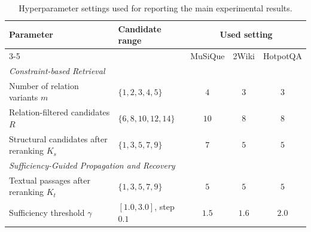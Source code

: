 \documentclass{article}
\theoremstyle{plain}
\theoremstyle{definition}
\theoremstyle{remark}
\begin{document}
\begin{table}[h]
\centering
\small
\setlength{\tabcolsep}{5pt}
\caption{Hyperparameter settings used for reporting the main experimental results.}
\label{tab:used_hyperparams}
\begin{tabular}{llccc}
\toprule
\multirow{2}{*}{Parameter} 
& \multirow{2}{*}{Candidate range} 
& \multicolumn{3}{c}{Used setting} \\
\cmidrule(lr){3-5}
& & MuSiQue & 2Wiki & HotpotQA \\
\midrule
\multicolumn{5}{l}{\textit{Constraint-based Retrieval}} \\
Number of relation variants \(m\) 
& \(\{1,2,3,4,5\}\) 
& \(4\) & \(3\) & \(3\) \\
Relation-filtered candidates \(R\) 
& \(\{6,8,10,12,14\}\) 
& \(10\) & \(8\) & \(8\) \\
Structural candidates after reranking \(K_s\) 
& \(\{1,3,5,7,9\}\) 
& \(7\) & \(5\) & \(5\) \\
\midrule
\multicolumn{5}{l}{\textit{Sufficiency-Guided Propagation and Recovery}} \\
Textual passages after reranking \(K_t\) 
& \(\{1,3,5,7,9\}\) 
& \(5\) & \(5\) & \(5\) \\
Sufficiency threshold \(\gamma\) 
& \([1.0,3.0]\), step \(0.1\) 
& \(1.5\) & \(1.6\) & \(2.0\) \\
\bottomrule
\end{tabular}
\end{table}
\end{document}
